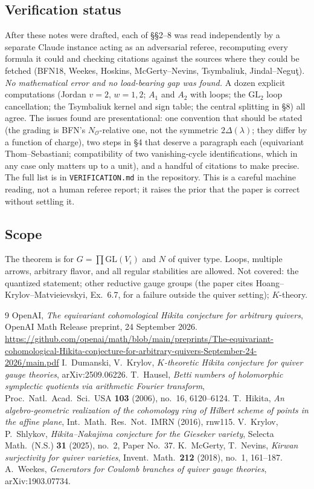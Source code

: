 \documentclass[11pt]{amsart}
\theoremstyle{remark}
\newcommand{\GL}{\mathrm{GL}}
\begin{document}
\subsection*{Verification status}
After these notes were drafted, each of \S\S2--8 was read independently by
a separate Claude instance acting as an adversarial referee, recomputing
every formula it could and checking citations against the sources where
they could be fetched (BFN18, Weekes, Hoskins, McGerty--Nevins,
Tsymbaliuk, Jindal--Negu\c t).  \emph{No mathematical error and no
load-bearing gap was found.}  A dozen explicit computations (Jordan
$v=2$, $w=1,2$; $A_1$ and $A_2$ with loops; the $\mathrm{GL}_2$ loop
cancellation; the Tsymbaliuk kernel and sign table; the central splitting
in \S8) all agree.  The issues found are presentational: one convention
that should be stated (the grading is BFN's $N_{\mathcal O}$-relative one,
not the symmetric $2\Delta(\lambda)$; they differ by a function of charge),
two steps in \S4 that deserve a paragraph each (equivariant
Thom--Sebastiani; compatibility of two vanishing-cycle identifications,
which in any case only matters up to a unit), and a handful of citations
to make precise.  The full list is in \texttt{VERIFICATION.md} in the
repository.  This is a careful machine reading, not a human referee
report; it raises the prior that the paper is correct without settling
it.

\subsection*{Scope}
The theorem is for $G=\prod\GL(V_i)$ and $N$ of quiver type.  Loops,
multiple arrows, arbitrary flavor, and all regular stabilities are allowed.
Not covered: the quantized statement; other reductive gauge groups (the
paper cites Hoang--Krylov--Matvieievskyi, Ex.~6.7, for a failure outside
the quiver setting); $K$-theory.

\begin{thebibliography}{9}
 OpenAI, \emph{The equivariant cohomological Hikita
conjecture for arbitrary quivers}, OpenAI Math Release preprint, 24 September 2026.
\url{https://github.com/openai/math/blob/main/preprints/The-equivariant-cohomological-Hikita-conjecture-for-arbitrary-quivers-September-24-2026/main.pdf}
 I.~Dumanski, V.~Krylov, \emph{$K$-theoretic Hikita conjecture for quiver gauge theories}, arXiv:2509.06226.
 T.~Hausel, \emph{Betti numbers of holomorphic symplectic quotients via arithmetic Fourier transform}, Proc.\ Natl.\ Acad.\ Sci.\ USA \textbf{103} (2006), no.~16, 6120--6124.
 T.~Hikita, \emph{An algebro-geometric realization of the cohomology ring of Hilbert scheme of points in the affine plane}, Int.\ Math.\ Res.\ Not.\ IMRN (2016), rnw115.
 V.~Krylov, P.~Shlykov, \emph{Hikita--Nakajima conjecture for the Gieseker variety}, Selecta Math.\ (N.S.) \textbf{31} (2025), no.~2, Paper No.~37.
 K.~McGerty, T.~Nevins, \emph{Kirwan surjectivity for quiver varieties}, Invent.\ Math.\ \textbf{212} (2018), no.~1, 161--187.
 A.~Weekes, \emph{Generators for Coulomb branches of quiver gauge theories}, arXiv:1903.07734.
\end{thebibliography}
\end{document}
